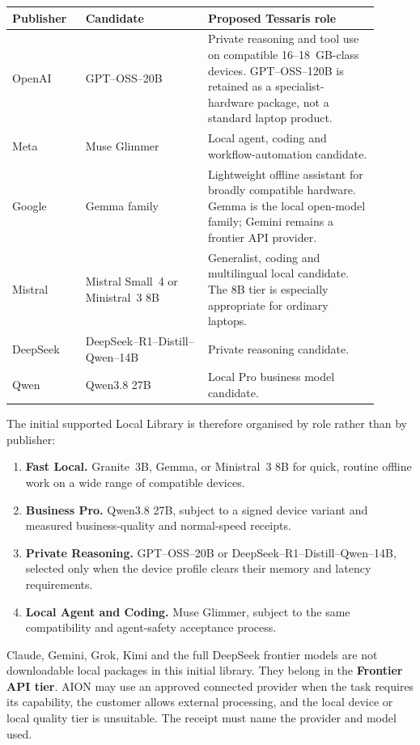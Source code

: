 \begin{center}
\begin{tabular}{p{0.18\linewidth}p{0.30\linewidth}p{0.42\linewidth}}
\textbf{Publisher} & \textbf{Candidate} & \textbf{Proposed Tessaris role} \\
\hline
OpenAI & GPT--OSS--20B & Private reasoning and tool use on compatible
16--18~GB-class devices.  GPT--OSS--120B is retained as a specialist-hardware
package, not a standard laptop product. \\
Meta & Muse Glimmer & Local agent, coding and workflow-automation candidate. \\
Google & Gemma family & Lightweight offline assistant for broadly compatible
hardware.  Gemma is the local open-model family; Gemini remains a frontier API
provider. \\
Mistral & Mistral Small~4 or Ministral~3 8B & Generalist, coding and
multilingual local candidate.  The 8B tier is especially appropriate for
ordinary laptops. \\
DeepSeek & DeepSeek--R1--Distill--Qwen--14B & Private reasoning candidate. \\
Qwen & Qwen3.8 27B & Local Pro business model candidate. \\
\end{tabular}
\end{center}

The initial supported Local Library is therefore organised by role rather than
by publisher:
\begin{enumerate}
  \item \textbf{Fast Local.}  Granite~3B, Gemma, or Ministral~3 8B for quick,
  routine offline work on a wide range of compatible devices.
  \item \textbf{Business Pro.}  Qwen3.8 27B, subject to a signed device
  variant and measured business-quality and normal-speed receipts.
  \item \textbf{Private Reasoning.}  GPT--OSS--20B or
  DeepSeek--R1--Distill--Qwen--14B, selected only when the device profile
  clears their memory and latency requirements.
  \item \textbf{Local Agent and Coding.}  Muse Glimmer, subject to the same
  compatibility and agent-safety acceptance process.
\end{enumerate}

Claude, Gemini, Grok, Kimi and the full DeepSeek frontier models are not
downloadable local packages in this initial library.  They belong in the
\textbf{Frontier API tier}.  AION may use an approved connected provider when
the task requires its capability, the customer allows external processing, and
the local device or local quality tier is unsuitable.  The receipt must name
the provider and model used.

